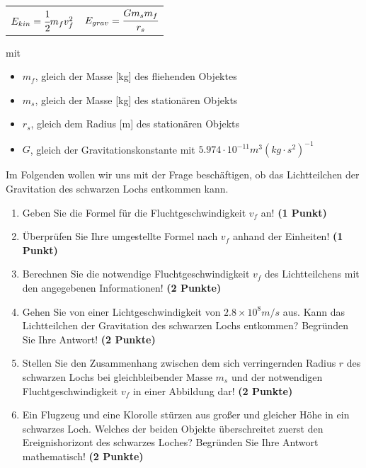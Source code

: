 \documentclass[a4paper, 9pt]{scrartcl}\usepackage[]{graphicx}\usepackage[]{xcolor}
\begin{document}
\begin{center}
  \begin{tabular}{cc}
    $E_{kin} = \cfrac{1}{2}m_fv_f^2$ & $E_{grav} = \cfrac{Gm_sm_f}{r_s}$\\
  \end{tabular}
\end{center}

mit

\begin{itemize}[noitemsep]
\item $m_f$, gleich der Masse [kg] des fliehenden Objektes
\item $m_s$, gleich der Masse [kg] des station{\"a}ren Objekts
\item $r_s$, gleich dem Radius [m] des station{\"a}ren Objekts  
\item $G$, gleich der Gravitationskonstante mit $5.974 \cdot 10^{-11}
  m^3(kg \cdot s^2)^{-1}$ 
\end{itemize}

Im Folgenden wollen wir uns mit der Frage besch{\"a}ftigen, ob das
Lichtteilchen der Gravitation des schwarzen Lochs entkommen kann.

\begin{enumerate}
\item Geben Sie die Formel f{\"u}r die Fluchtgeschwindigkeit $v_f$ an! 
  \textbf{(1 Punkt)}
\item {\"U}berpr{\"u}fen Sie Ihre umgestellte Formel nach $v_f$ anhand der Einheiten!
  \textbf{(1 Punkt)} 
\item Berechnen Sie die notwendige Fluchtgeschwindigkeit $v_f$ des
  Lichtteilchens mit den angegebenen Informationen! \textbf{(2 Punkte)}
\item Gehen Sie von einer Lichtgeschwindigkeit von $\ensuremath{2.8\times 10^{8}}m/s$
  aus. Kann das Lichtteilchen der Gravitation des schwarzen Lochs
  entkommen? Begr{\"u}nden Sie Ihre Antwort! \textbf{(2 Punkte)}
\item Stellen Sie den Zusammenhang zwischen dem sich verringernden Radius
  $r$ des schwarzen Lochs bei gleichbleibender Masse $m_s$
  und der notwendigen Fluchtgeschwindigkeit $v_f$ in einer Abbildung dar!
  \textbf{(2 Punkte)}
 \item Ein Flugzeug und eine Klorolle st{\"u}rzen aus gro{\ss}er und gleicher H{\"o}he
  in ein schwarzes Loch. Welches der beiden Objekte {\"u}berschreitet zuerst
  den Ereignishorizont des schwarzes Loches? Begr{\"u}nden
  Sie Ihre Antwort mathematisch! \textbf{(2 Punkte)}  
\end{enumerate}
\end{document}
